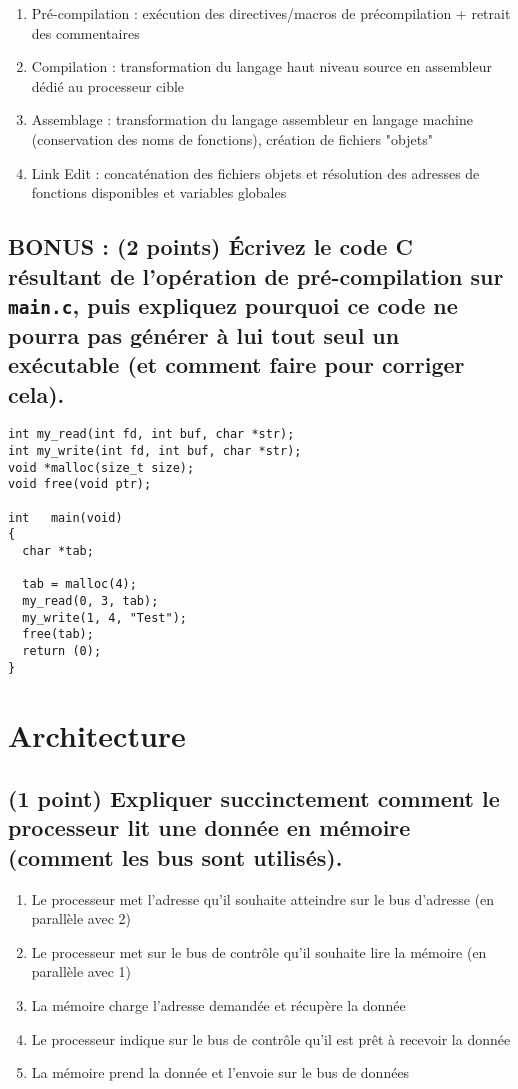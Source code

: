 \documentclass[11pt,a4paper]{article}
\begin{document}
\bigskip
\begin{enumerate}
\item Pré-compilation : exécution des directives/macros de précompilation + retrait des commentaires
\item Compilation : transformation du langage haut niveau source en assembleur dédié au processeur cible
\item Assemblage : transformation du langage assembleur en langage machine (conservation des noms de fonctions), création de fichiers "objets"
\item Link Edit : concaténation des fichiers objets et résolution des adresses de fonctions disponibles et variables globales
\end{enumerate}
\bigskip

\subsection{BONUS : (2 points) \'Ecrivez le code C résultant de l'opération de pré-compilation sur \texttt{main.c}, puis expliquez pourquoi ce code ne pourra pas générer à lui tout seul un exécutable (et comment faire pour corriger cela).}

\bigskip

\lstset{language=c}
\begin{lstlisting}[frame=single,title={main.c}]
int my_read(int fd, int buf, char *str);
int my_write(int fd, int buf, char *str);
void *malloc(size_t size);
void free(void ptr);

int   main(void)
{
  char *tab;

  tab = malloc(4);
  my_read(0, 3, tab);
  my_write(1, 4, "Test");
  free(tab);
  return (0);
}
\end{lstlisting}

\bigskip

\section{Architecture} %

\subsection{(1 point) Expliquer succinctement comment le processeur lit une donnée en mémoire (comment les bus sont utilisés).}

\bigskip
\begin{enumerate}
\item Le processeur met l'adresse qu'il souhaite atteindre sur le bus d'adresse (en parallèle avec 2)
\item Le processeur met sur le bus de contrôle qu'il souhaite lire la mémoire (en parallèle avec 1)
\item La mémoire charge l'adresse demandée et récupère la donnée
\item Le processeur indique sur le bus de contrôle qu'il est prêt à recevoir la donnée
\item La mémoire prend la donnée et l'envoie sur le bus de données
\end{enumerate}
\bigskip
\end{document}
